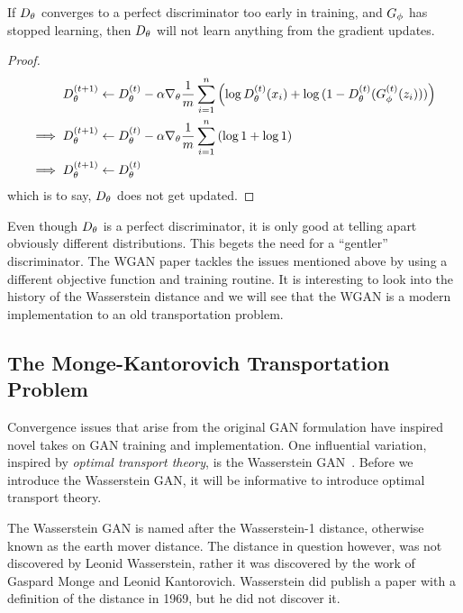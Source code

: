 \begin{theorem}%
  \label{thm:too-early}
  If $D_\theta$ converges to a perfect discriminator too early in training,
  and $G_\phi$ has stopped learning, then $D_\theta$ will not learn anything
  from the gradient updates.
\end{theorem}

\begin{proof}
  \begin{align}
    \label{eq:d-updates-no-good}
    D_\theta^{(t+1)} & \gets D_\theta^{(t)} - \alpha \nabla_\theta {1 \over m}
                 \sum_{i=1}^n \left( \log D^{(t)}_\theta(x_i)
                 + \log{(1 - D^{(t)}_\theta(G^{(t)}_\phi(z_i)))} \right) \\
    \implies D_\theta^{(t+1)} & \gets D_\theta^{(t)} - \alpha\nabla_\theta {1 \over m} \sum_{i=1}^n \left( \log{1} + \log{1} \right) \\
    \implies D_\theta^{(t+1)} & \gets D_\theta^{(t)}
  \end{align} which is to say, $D_\theta$ does not get updated.
\end{proof}

Even though $D_\theta$ is a perfect discriminator, it is only good at
telling apart obviously different distributions. This begets the need
for a ``gentler'' discriminator.  The WGAN paper tackles the issues
mentioned above by using a different objective function and training
routine.  It is interesting to look into the history of the
Wasserstein distance and we will see that the WGAN is a modern
implementation to an old transportation problem.

\subsection{The Monge-Kantorovich Transportation Problem}

Convergence issues that arise from the original GAN formulation have
inspired novel takes on GAN training and implementation. One
influential variation, inspired by \textit{optimal transport theory},
is the Wasserstein GAN~\cite{ref:arjovsky-2017}. Before we introduce
the Wasserstein GAN, it will be informative to introduce optimal
transport theory.

The Wasserstein GAN is named after the Wasserstein-1 distance,
otherwise known as the earth mover distance. The distance in question
however, was not discovered by Leonid Wasserstein, rather it was
discovered by the work of Gaspard Monge and Leonid
Kantorovich. Wasserstein did publish a paper with a definition of the
distance in 1969, but he did not discover it.

